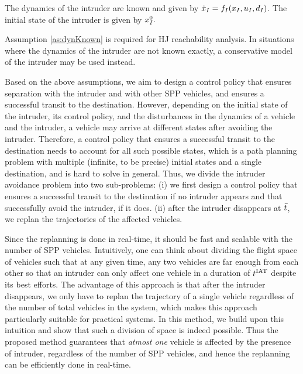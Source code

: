 \begin{assumption}
\label{as:dynKnown}
The dynamics of the intruder are known and given by $\dot{x}_I = f_I(x_I, u_I, d_I)$. The initial state of the intruder is given by $x_{I}^0.$
\end{assumption}

Assumption \ref{as:dynKnown} is required for HJ reachability analysis. In situations where the dynamics of the intruder are not known exactly, a conservative model of the intruder may be used instead.

Based on the above assumptions, we aim to design a control policy that ensures separation with the intruder and with other SPP vehicles, and ensures a successful transit to the destination. However, depending on the initial state of the intruder, its control policy, and the disturbances in the dynamics of a vehicle and the intruder, a vehicle may arrive at different states after avoiding the intruder. Therefore, a control policy that ensures a successful transit to the destination needs to account for all such possible states, which is a path planning problem with multiple (infinite, to be precise) initial states and a single destination, and is hard to solve in general. Thus, we divide the intruder avoidance problem into two sub-problems: (i) we first design a control policy that ensures a successful transit to the destination if no intruder appears and that successfully avoid the intruder, if it does. (ii) after the intruder disappears at $\bar{t}$, we replan the trajectories of the affected vehicles. 

Since the replanning is done in real-time, it should be fast and scalable with the number of SPP vehicles. Intuitively, one can think about dividing the flight space of vehicles such that at any given time, any two vehicles are far enough from each other so that an intruder can only affect one vehicle in a duration of $t^\text{IAT}$ despite its best efforts. The advantage of this approach is that after the intruder disappears, we only have to replan the trajectory of a single vehicle regardless of the number of total vehicles in the system, which makes this approach particularly suitable for practical systems. In this method, we build upon this intuition and show that such a division of space is indeed possible. Thus the proposed method guarantees that \textit{atmost one} vehicle is affected by the presence of intruder, regardless of the number of SPP vehicles, and hence the replanning can be efficiently done in real-time. 

